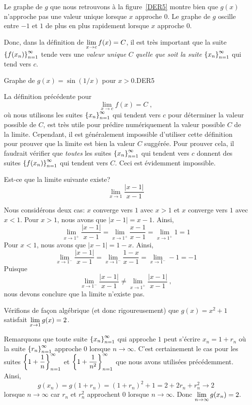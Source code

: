 {\begin{egg}
Le graphe de $g$ que nous retrouvons à la figure~\ref{DER5} montre bien
que $g(x)$ n'approche pas une valeur unique lorsque $x$ approche $0$.
Le graphe de $g$ oscille entre $-1$ et $1$ de plus en plus rapidement
lorsque $x$ approche $0$.

Donc, dans la définition de $\displaystyle \lim_{x\rightarrow c} f(x) = C$,
il est très important que la suite
$\displaystyle \left\{f(x_n)\right\}_{n=1}^\infty$ tende vers une
{\em valeur unique} $C$ {\em quelle que soit la suite}
$\displaystyle \left\{x_n\right\}_{n=1}^\infty$ qui tend vers $c$.
\end{egg}

{Graphe de $g(x) = \sin(1/x)$ pour $x >0$.}{DER5}

La définition précédente pour
\[
\lim_{x\rightarrow c} f(x) = C \; ,
\]
où nous utilisons les suites $\displaystyle \left\{x_n\right\}_{n=1}^\infty$
qui tendent vers $c$ pour déterminer la valeur possible de $C$, est
très utile pour prédire numériquement la valeur possible $C$ de la
limite. Cependant, il est généralement impossible d'utiliser cette
définition pour prouver que la limite est bien la valeur $C$ suggérée.
Pour prouver cela, il faudrait vérifier que {\em toutes} les suites
$\displaystyle \left\{x_n\right\}_{n=1}^\infty$ qui tendent vers $c$
donnent des suites $\displaystyle \left\{f(x_n)\right\}_{n=1}^\infty$
qui tendent vers $C$.  Ceci est évidemment impossible.

\begin{egg}
Est-ce que la limite suivante existe?
\[
\lim_{x\to 1} \frac{|x-1|}{x-1}
\]

Nous considérons deux cas: $x$ converge vers $1$ avec $x>1$ et $x$
converge vers $1$ avec $x<1$.  Pour $x>1$, nous avons que $|x-1| = x-1$.
Ainsi,
\[
\lim_{x\to 1^+} \frac{|x-1|}{x-1} = \lim_{x\to 1^+} \frac{x-1}{x-1}
= \lim_{x\to 1^+} 1 = 1
\]
Pour $x<1$, nous avons que $|x-1| = 1 - x$.  Ainsi,
\[
\lim_{x\to 1^-} \frac{|x-1|}{x-1} = \lim_{x\to 1^-} \frac{1-x}{x-1}
= \lim_{x\to 1^-} -1 = -1
\]
Puisque
\[
\lim_{x\to 1^-} \frac{|x-1|}{x-1} \neq \lim_{x\to 1^+}
\frac{|x-1|}{x-1} \ ,
\]
nous devons conclure que la limite n'existe pas.
\end{egg}

\begin{egg}
Vérifions de façon algébrique (et donc rigoureusement) que
$g(x) = x^2 +1$ satisfait $\displaystyle \lim_{x\rightarrow 1} g(x) = 2$.

Remarquons que toute suite
$\displaystyle \left\{x_n\right\}_{n=1}^\infty$
qui approche $1$ peut s'écrire $x_n = 1 + r_n$ où la suite
$\displaystyle \left\{r_n\right\}_{n=1}^\infty$ approche $0$ lorsque
$n \to \infty$.  C'est certainement le cas pour les
suites $\displaystyle \left\{ 1 + \frac{1}{n} \right\}_{n=1}^\infty$
et $\displaystyle \left\{1+\frac{1}{n^2} \right\}_{n=1}^\infty$
que nous avons utilisées précédemment.  Ainsi,
\[
g(x_n) = g(1+r_n) = (1+r_n)^2 + 1 = 2 + 2r_n + r_n^2 \to 2
\]
lorsque $n \to \infty$ car $r_n$ et $r_n^2$ approchent $0$ lorsque
$n \to \infty$.  Donc $\displaystyle \lim_{n\rightarrow \infty} g(x_n) = 2$.
\label{egg_contcont1}
\end{egg}

}
